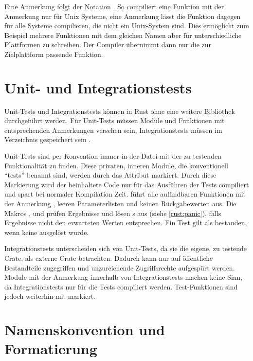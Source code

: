 Eine Anmerkung folgt der Notation . So compiliert eine Funktion mit der Anmerkung  nur für Unix Systeme, eine Anmerkung  lässt die Funktion dagegen für alle Systeme compilieren, die nicht ein Unix-System sind.
Dies ermöglicht zum Beispiel mehrere Funktionen mit dem gleichen Namen aber für unterschiedliche Plattformen zu schreiben.
Der Compiler übernimmt dann nur die zur Zielplattform passende Funktion.

\section{Unit- und Integrationstests}
\label{rust:tests}

Unit-Tests und Integrationstests können in Rust ohne eine weitere Bibliothek durchgeführt werden.
Für Unit-Tests müssen Module und Funktionen mit entsprechenden Anmerkungen versehen sein, Integrationstests müssen im Verzeichnis  gespeichert sein \cite{rust:book:tests}.

Unit-Tests sind per Konvention immer in der Datei mit der zu testenden Funktionalität zu finden.
Diese privaten, inneren Module, die konventionell \enquote{tests} benannt sind, werden durch das Attribut  markiert.
Durch diese Markierung wird der beinhaltete Code nur für das Ausführen der Tests compiliert und spart bei normaler Kompilation Zeit.
 führt alle auffindbaren Funktionen mit der Anmerkung \rustcinline{#[test]}, leeren Parameterlisten und keinen Rückgabewerten aus.
Die Makros ,  und  prüfen Ergebnisse und lösen s aus (siehe \autoref{rust:panic}), falls Ergebnisse nicht den erwarteten Werten entsprechen.
Ein Test gilt als bestanden, wenn keine  ausgelöst wurde.

Integrationstests unterscheiden sich von Unit-Tests, da sie die eigene, zu testende Crate, als externe Crate betrachten.
Dadurch kann nur auf öffentliche Bestandteile zugegriffen und unzureichende Zugriffsrechte aufgespürt werden.
Module mit der Anmerkung  innerhalb von Integrationstests machen keine Sinn, da Integrationstests nur für die Tests compiliert werden.
Test-Funktionen sind jedoch weiterhin mit \rustcinline{#[test]} markiert.


\section{Namenskonvention und Formatierung}
\label{rust:styleguide}

